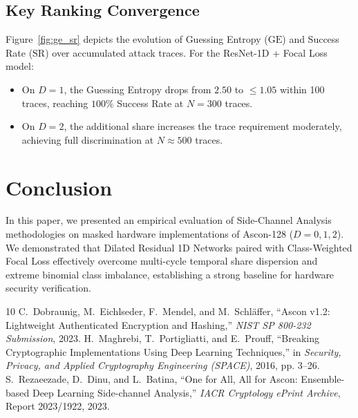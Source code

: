 \documentclass[journal,10pt,twocolumn]{IEEEtran}
\begin{document}
\subsection{Key Ranking Convergence}
Figure~\ref{fig:ge_sr} depicts the evolution of Guessing Entropy ($\text{GE}$) and Success Rate ($\text{SR}$) over accumulated attack traces. For the ResNet-1D + Focal Loss model:
\begin{itemize}
    \item On $D=1$, the Guessing Entropy drops from $2.50$ to $\le 1.05$ within 100 traces, reaching $100\%$ Success Rate at $N = 300$ traces.
    \item On $D=2$, the additional share increases the trace requirement moderately, achieving full discrimination at $N \approx 500$ traces.
\end{itemize}

\section{Conclusion}
In this paper, we presented an empirical evaluation of Side-Channel Analysis methodologies on masked hardware implementations of Ascon-128 ($D=0, 1, 2$). We demonstrated that Dilated Residual 1D Networks paired with Class-Weighted Focal Loss effectively overcome multi-cycle temporal share dispersion and extreme binomial class imbalance, establishing a strong baseline for hardware security verification.

\begin{thebibliography}{10}
 C.~Dobraunig, M.~Eichlseder, F.~Mendel, and M.~Schl{\"a}ffer, ``Ascon v1.2: Lightweight Authenticated Encryption and Hashing,'' \emph{NIST SP 800-232 Submission}, 2023.
 H.~Maghrebi, T.~Portigliatti, and E.~Prouff, ``Breaking Cryptographic Implementations Using Deep Learning Techniques,'' in \emph{Security, Privacy, and Applied Cryptography Engineering (SPACE)}, 2016, pp. 3--26.
 S.~Rezaeezade, D.~Dinu, and L.~Batina, ``One for All, All for Ascon: Ensemble-based Deep Learning Side-channel Analysis,'' \emph{IACR Cryptology ePrint Archive}, Report 2023/1922, 2023.
\end{thebibliography}
\end{document}
